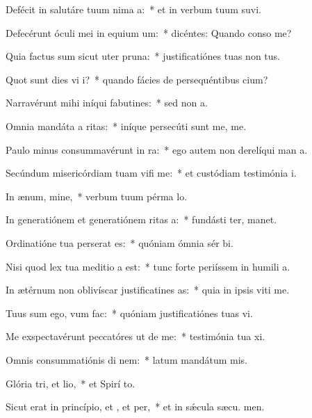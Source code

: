 \item Defécit in salutáre tuum nima a:~* et in verbum tuum suvi.
\item Defecérunt óculi mei in equium um:~* dicéntes: Quando conso me?
\item Quia factus sum sicut uter  pruna:~* justificatiónes tuas non  tus.
\item Quot sunt dies vi i?~* quando fácies de persequéntibus  cium?
\item Narravérunt mihi iníqui fabutines:~* sed non   a.
\item Omnia mandáta a ritas:~* iníque persecúti sunt me,  me.
\item Paulo minus consummavérunt  in ra:~* ego autem non derelíqui man a.
\item Secúndum misericórdiam tuam vifi me:~* et custódiam testimónia  i.
\item In ænum, mine,~* verbum tuum pérma  lo.
\item In generatiónem et generatiónem ritas a:~* fundásti ter,  manet.
\item Ordinatióne tua perserat es:~* quóniam ómnia sér bi.
\item Nisi quod lex tua meditio a est:~* tunc forte periíssem in humili a.
\item In ætérnum non oblivíscar justificatines as:~* quia in ipsis viti me.
\item Tuus sum ego, vum  fac:~* quóniam justificatiónes tuas vi.
\item Me exspectavérunt peccatóres ut de me:~* testimónia tua xi.
\item Omnis consummatiónis di nem:~* latum mandátum  mis.
\item Glória tri, et lio,~* et Spirí to.
\item Sicut erat in princípio, et , et per,~* et in sǽcula sæcu. men.
